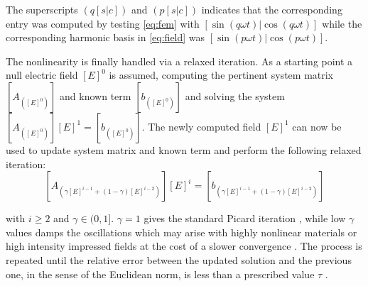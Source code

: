 \documentclass[journal,twoside]{IEEEtran}
\begin{document}
\noindent The superscripts $(q[s|c])$ and $(p[s|c])$ indicates that the corresponding
entry was computed by testing \eqref{eq:fem} with $[\sin(q \omega t) | \cos(q \omega t)]$ 
while the corresponding harmonic basis in \eqref{eq:field}
was $[\sin(p \omega t) | \cos(p \omega t)]$.

The nonlinearity is finally handled via a
relaxed iteration. As a starting point a null electric field $[E]^0$ is assumed,
computing the pertinent system matrix $[A_{([E]^0)}]$ and
known term $[b_{([E]^0)}]$ and solving the system $[A_{([E]^0)}] [E]^1 =
[b_{([E]^0)}]$. The newly computed field $[E]^1$ can now be used to update system
matrix and known term and perform the following relaxed iteration:
\begin{equation} \label{eq:lastLinearSystem}
 [A_{(\gamma [E]^{i-1} + (1-\gamma) [E]^{i-2})}] [E]^{i} = [b_{(\gamma [E]^{i-1}
 + (1-\gamma) [E]^{i-2})}]
\end{equation}
% 

\noindent with $i \geq 2$ and
$\gamma\in(0,1]$. $\gamma=1$ gives the standard Picard iteration 
\cite{Guarnieri2010}, while low $\gamma$ values damps the oscillations
which may arise with highly nonlinear materials or high intensity impressed
fields at the cost of a slower convergence \cite{Silvester1997}. The process 
is repeated until the relative error between the updated solution
and the previous one, in the sense of the Euclidean norm, is less than a
prescribed value $\tau$ \cite{Guarnieri2010}.
\end{document}
